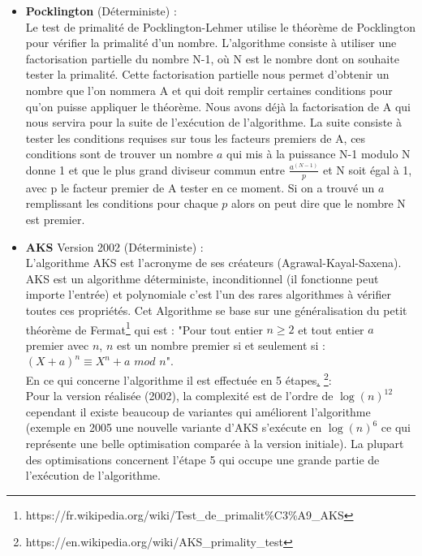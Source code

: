\begin{itemize}
			\item \textbf{Pocklington} (Déterministe) :\\
			 Le test de primalité de Pocklington-Lehmer utilise le théorème de Pocklington pour vérifier la primalité d’un nombre.
L’algorithme consiste à utiliser une factorisation partielle du nombre N-1, où N est le nombre dont on souhaite tester la primalité. Cette factorisation partielle nous permet d’obtenir un nombre que l’on nommera A et qui doit remplir certaines conditions pour qu’on puisse appliquer le théorème.
Nous avons déjà la factorisation de A qui nous servira pour la suite de l'exécution de l’algorithme. 
La suite consiste à tester les conditions requises sur tous les facteurs premiers de A, ces conditions sont de trouver un nombre $a$ qui mis à la puissance N-1 modulo N donne 1 et que le plus grand diviseur commun entre {\Large$\frac{a^{(N-1)}}{p}$} et N soit égal à 1, avec p le facteur premier de A tester en ce moment. Si on a trouvé un $a$ remplissant les conditions pour chaque $p$ alors on peut dire que le nombre N est premier.\\

			\item \textbf{AKS} Version 2002 (Déterministe) :\\
			L'algorithme AKS est l’acronyme de ses créateurs (Agrawal-Kayal-Saxena). AKS est un algorithme déterministe, inconditionnel (il fonctionne peut importe l'entrée) et polynomiale c'est l'un des rares algorithmes à vérifier toutes ces propriétés. Cet Algorithme se base sur une généralisation du petit théorème de Fermat\footnote{https://fr.wikipedia.org/wiki/Test\_de\_primalit\%C3\%A9\_AKS} qui est : "Pour tout entier $n \geq 2$ et tout entier $a$ premier avec $n$, $n$ est un nombre premier si et seulement si : $(X + a)^n \equiv X^n + a$ $mod$ $n$".\\

En ce qui concerne l’algorithme il est effectuée en 5 étapes\href{AKS}.
\footnote{https://en.wikipedia.org/wiki/AKS\_primality\_test}:\\

Pour la version réalisée (2002), la complexité est de l'ordre de $\log(n)^{12}$ cependant il existe beaucoup de variantes qui améliorent l'algorithme (exemple en 2005 une nouvelle variante d'AKS s’exécute en $\log(n)^6$ ce qui représente une belle optimisation comparée à la version initiale). La plupart des optimisations concernent l'étape 5 qui occupe une grande partie de l'exécution de l'algorithme.\\
			

\end{itemize}
